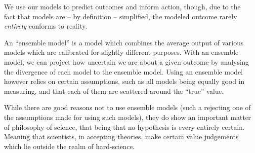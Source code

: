 \documentclass[12pt]{report}
\begin{document}
We use our models to predict outcomes and inform action, though, due to the fact
that models are -- by definition -- simplified, the modeled outcome rarely
\emph{entirely} conforms to reality.

An ``ensemble model'' is a model which combines the average output of various
models which are calibrated for slightly different purposes. With an ensemble
model, we can project how uncertain we are about a given outcome by analysing
the divergence of each model to the ensemble model.  Using an ensemble model
however relies on certain assumptions, such as all models being equally good in
measuring, and that each of them are scattered around the ``true'' value.

While there are good reasons not to use ensemble models (such a rejecting one of
the assumptions made for using such models), they do show an important matter of
philosophy of science, that being that no hypothesis is every entirely certain.
Meaning that scientists, in accepting theories, make certain value judgements
which lie outside the realm of hard-science.
\end{document}
